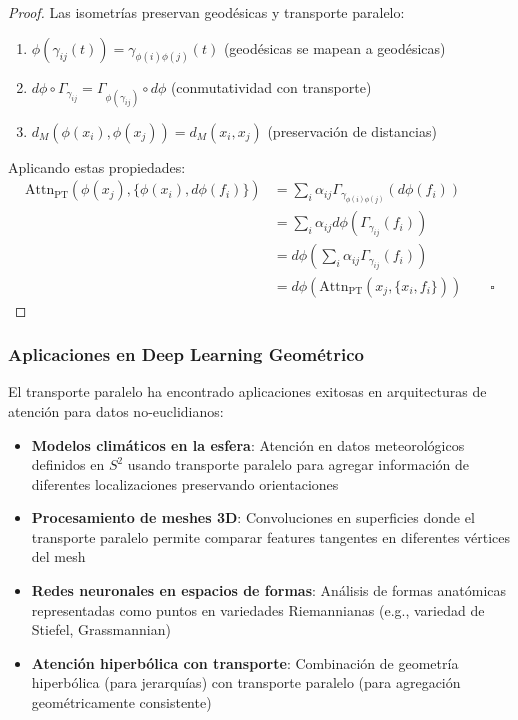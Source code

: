 \begin{proof}
Las isometrías preservan geodésicas y transporte paralelo:
\begin{enumerate}
    \item $\phi(\gamma_{ij}(t)) = \gamma_{\phi(i)\phi(j)}(t)$ (geodésicas se mapean a geodésicas)
    \item $d\phi \circ \Gamma_{\gamma_{ij}} = \Gamma_{\phi(\gamma_{ij})} \circ d\phi$ (conmutatividad con transporte)
    \item $d_M(\phi(x_i), \phi(x_j)) = d_M(x_i, x_j)$ (preservación de distancias)
\end{enumerate}

Aplicando estas propiedades:
\begin{align}
\text{Attn}_{\text{PT}}(\phi(x_j), \{\phi(x_i), d\phi(f_i)\}) &= \sum_i \alpha_{ij} \Gamma_{\gamma_{\phi(i)\phi(j)}}(d\phi(f_i)) \\
&= \sum_i \alpha_{ij} d\phi(\Gamma_{\gamma_{ij}}(f_i)) \\
&= d\phi\left(\sum_i \alpha_{ij} \Gamma_{\gamma_{ij}}(f_i)\right) \\
&= d\phi(\text{Attn}_{\text{PT}}(x_j, \{x_i, f_i\})) \qquad \square
\end{align}
\end{proof}

\subsubsection{Aplicaciones en Deep Learning Geométrico}

El transporte paralelo ha encontrado aplicaciones exitosas en arquitecturas de atención para datos no-euclidianos:

\begin{itemize}
    \item \textbf{Modelos climáticos en la esfera}: Atención en datos meteorológicos definidos en $S^2$ usando transporte paralelo para agregar información de diferentes localizaciones preservando orientaciones

    \item \textbf{Procesamiento de meshes 3D}: Convoluciones en superficies donde el transporte paralelo permite comparar features tangentes en diferentes vértices del mesh

    \item \textbf{Redes neuronales en espacios de formas}: Análisis de formas anatómicas representadas como puntos en variedades Riemannianas (e.g., variedad de Stiefel, Grassmannian)

    \item \textbf{Atención hiperbólica con transporte}: Combinación de geometría hiperbólica (para jerarquías) con transporte paralelo (para agregación geométricamente consistente)
\end{itemize}

